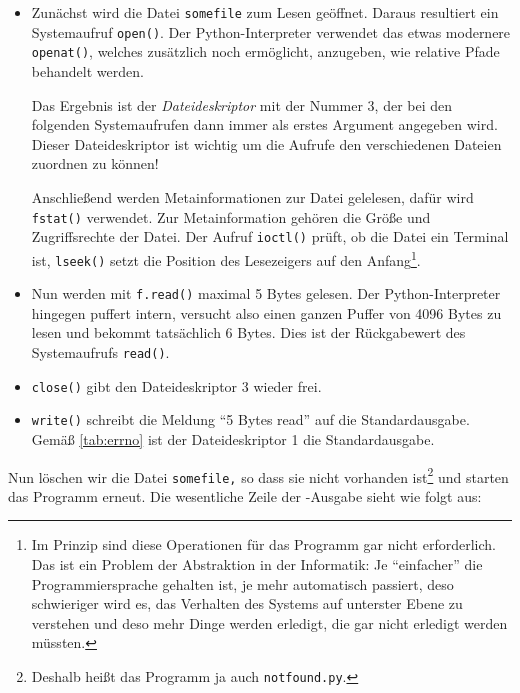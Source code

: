 \begin{itemize}
  \item Zunächst wird die Datei \texttt{somefile} zum Lesen geöffnet. Daraus resultiert
    ein Systemaufruf \texttt{open()}. Der Python-Interpreter verwendet das etwas modernere
    \texttt{openat()}, welches zusätzlich noch ermöglicht, anzugeben, wie relative Pfade
    behandelt werden.

    Das Ergebnis ist der \emph{Dateideskriptor} mit der Nummer 3, der bei den folgenden
    Systemaufrufen dann immer als erstes Argument angegeben wird. Dieser Dateideskriptor ist wichtig
    um die Aufrufe den verschiedenen Dateien zuordnen zu können!

    Anschließend werden Metainformationen zur Datei gelelesen, dafür wird \texttt{fstat()}
    verwendet. Zur Metainformation gehören die Größe und Zugriffsrechte der Datei. Der Aufruf
    \texttt{ioctl()} prüft, ob die Datei ein Terminal ist, \texttt{lseek()} setzt die Position
    des Lesezeigers auf den Anfang\footnote{Im Prinzip sind diese Operationen für das Programm
    gar nicht erforderlich. Das ist ein Problem der Abstraktion in der Informatik: Je "`einfacher"'
    die Programmiersprache gehalten ist, je mehr automatisch passiert, deso schwieriger wird es,
    das Verhalten des Systems auf unterster Ebene zu verstehen und deso mehr Dinge werden
    erledigt, die gar nicht erledigt werden müssten.}.

  \item Nun werden mit \texttt{f.read()} maximal 5 Bytes gelesen. Der Python-Interpreter hingegen
    puffert intern, versucht also einen ganzen Puffer von 4096 Bytes zu lesen und bekommt tatsächlich 6 Bytes. Dies ist der Rückgabewert des Systemaufrufs \texttt{read()}.

  \item \texttt{close()} gibt den Dateideskriptor 3 wieder frei.

  \item \texttt{write()} schreibt die Meldung "`5 Bytes read"' auf die Standardausgabe. Gemäß
    \autoref{tab:errno} ist der Dateideskriptor 1 die Standardausgabe.
\end{itemize}


Nun löschen wir die Datei \texttt{somefile,} so dass sie nicht vorhanden ist\footnote{Deshalb heißt
das Programm ja auch \texttt{notfound.py}.} und starten das Programm erneut. Die wesentliche
Zeile der \strace-Ausgabe sieht wie folgt aus:

